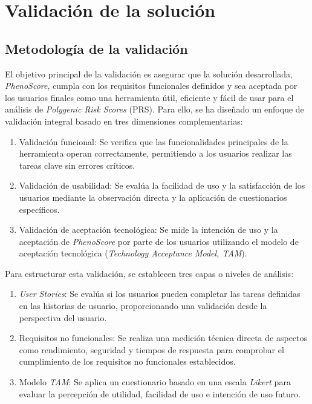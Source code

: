 \chapter{Validación de la solución}
\label{chap:pruebas}

\section{Metodología de la validación}
El objetivo principal de la validación es asegurar que la solución desarrollada, \textit{PhenoScore}, cumpla con los requisitos funcionales definidos y sea aceptada por los usuarios finales como una herramienta útil, eficiente y fácil de usar para el análisis de \textit{Polygenic Risk Scores} (PRS).
Para ello, se ha diseñado un enfoque de validación integral basado en tres dimensiones complementarias:

\begin{enumerate}
    \item Validación funcional: Se verifica que las funcionalidades principales de la herramienta operan correctamente, permitiendo a los usuarios realizar las tareas clave sin errores críticos.
    \item Validación de usabilidad: Se evalúa la facilidad de uso y la satisfacción de los usuarios mediante la observación directa y la aplicación de cuestionarios específicos.
    \item Validación de aceptación tecnológica: Se mide la intención de uso y la aceptación de \textit{PhenoScore} por parte de los usuarios utilizando el modelo de aceptación tecnológica (\textit{Technology Acceptance Model, TAM})\cite{davis1989}.
\end{enumerate}

Para estructurar esta validación, se establecen tres capas o niveles de análisis:

\begin{enumerate}
    \item \textit{User Stories}: Se evalúa si los usuarios pueden completar las tareas definidas en las historias de usuario, proporcionando una validación desde la perspectiva del usuario.
    \item Requisitos no funcionales: Se realiza una medición técnica directa de aspectos como rendimiento, seguridad y tiempos de respuesta para comprobar el cumplimiento de los requisitos no funcionales establecidos.
    \item Modelo \textit{TAM}: Se aplica un cuestionario basado en una escala \textit{Likert} para evaluar la percepción de utilidad, facilidad de uso e intención de uso futuro.
\end{enumerate}


